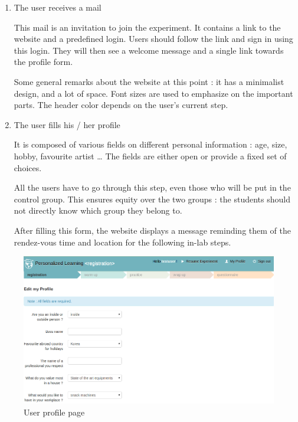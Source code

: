 \documentclass[a4paper,12pt]{article}
\makeatletter
\def\maxwidth{%
  \ifdim\Gin@nat@width>\linewidth
    \linewidth
  \else
    \Gin@nat@width
  \fi
}
\makeatother
\begin{document}
\begin{enumerate}

\item The user receives a mail

This mail is an invitation to join the experiment. It contains a link to the website and a predefined login. Users should follow the link and sign in using this login. They will then see a welcome message and a single link towards the profile form.

Some general remarks about the website at this point : it has a minimalist design, and a lot of space. Font sizes are used to emphasize on the important
parts. The header color depends on the user's current step.

\item The user fills his / her profile

It is composed of various fields on different personal information : age, size, hobby, favourite artist … The fields are either open or provide a fixed set of choices.

All the users have to go through this step, even those who will be put in the control group. This ensures equity over the two groups : the students should not directly know which group they belong to.

After filling this form, the website displays a message reminding them of the rendez-vous time and location for the following in-lab steps.
\end{enumerate}

\begin{figure}
\begin{center}
\includegraphics[width=\maxwidth]{registration.png}
\caption{User profile page}
\label{means}
\end{center}
\end{figure}
\end{document}

